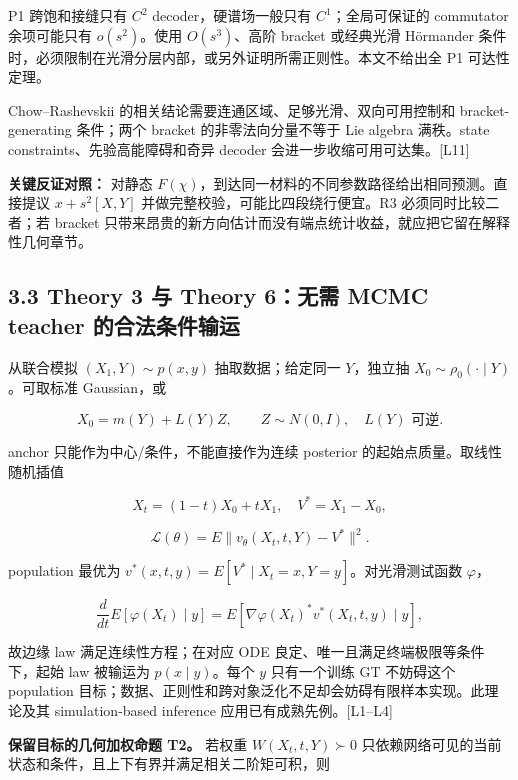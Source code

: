 \documentclass[
  11pt,
  a4paper,
]{article}
\begin{document}
P1 跨饱和接缝只有 \(C^2\) decoder，硬谱场一般只有 \(C^1\)；全局可保证的
commutator 余项可能只有 \(o(s^2)\)。使用 \(O(s^3)\)、高阶 bracket
或经典光滑 Hörmander
条件时，必须限制在光滑分层内部，或另外证明所需正则性。本文不给出全 P1
可达性定理。

Chow--Rashevskii 的相关结论需要连通区域、足够光滑、双向可用控制和
bracket-generating 条件；两个 bracket 的非零法向分量不等于 Lie algebra
满秩。state constraints、先验高能障碍和奇异 decoder
会进一步收缩可用可达集。{[}L11{]}

\textbf{关键反证对照：} 对静态
\(F(\chi)\)，到达同一材料的不同参数路径给出相同预测。直接提议
\(x+s^2[X,Y]\) 并做完整校验，可能比四段绕行便宜。R3 必须同时比较二者；若
bracket
只带来昂贵的新方向估计而没有端点统计收益，就应把它留在解释性几何章节。

\hypertarget{theory-3-ux4e0e-theory-6ux65e0ux9700-mcmc-teacher-ux7684ux5408ux6cd5ux6761ux4ef6ux8f93ux8fd0}{%
\subsection{3.3 Theory 3 与 Theory 6：无需 MCMC teacher
的合法条件输运}\label{theory-3-ux4e0e-theory-6ux65e0ux9700-mcmc-teacher-ux7684ux5408ux6cd5ux6761ux4ef6ux8f93ux8fd0}}

从联合模拟 \((X_1,Y)\sim p(x,y)\) 抽取数据；给定同一 \(Y\)，独立抽
\(X_0\sim\rho_0(\cdot\mid Y)\)。可取标准 Gaussian，或

\[X_0=m(Y)+L(Y)Z,\qquad Z\sim N(0,I),\quad L(Y)\text{ 可逆}.\]

anchor 只能作为中心/条件，不能直接作为连续 posterior
的起始点质量。取线性随机插值

\[X_t=(1-t)X_0+tX_1,\quad V^*=X_1-X_0,\]

\[\mathcal{L}(\theta)=E\|v_\theta(X_t,t,Y)-V^*\|^2.\]

population 最优为 \(v^*(x,t,y)=E[V^*\mid X_t=x,Y=y]\)。对光滑测试函数
\(\varphi\)，

\[\frac d{dt}E[\varphi(X_t)\mid y]=E[\nabla\varphi(X_t)^*v^*(X_t,t,y)\mid y],\]

故边缘 law 满足连续性方程；在对应 ODE
良定、唯一且满足终端极限等条件下，起始 law 被输运为 \(p(x\mid y)\)。每个
\(y\) 只有一个训练 GT 不妨碍这个 population
目标；数据、正则性和跨对象泛化不足却会妨碍有限样本实现。此理论及其
simulation-based inference 应用已有成熟先例。{[}L1--L4{]}

\textbf{保留目标的几何加权命题 T2。} 若权重 \(W(X_t,t,Y)\succ0\)
只依赖网络可见的当前状态和条件，且上下有界并满足相关二阶矩可积，则
\end{document}
